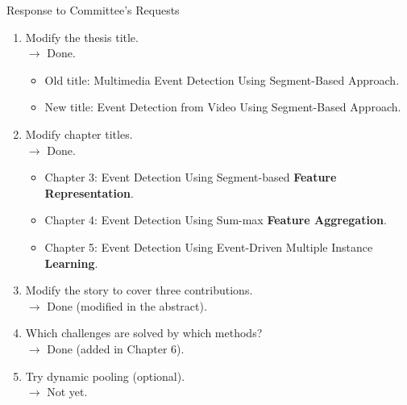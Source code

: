 \documentclass{beamer}
\begin{document}
	
\begin{frame}{Response to Committee's Requests} 	
	\begin{enumerate}
		\item Modify the thesis title.
		\\
		$\rightarrow$ Done. 
		\begin{itemize}
			\item \scriptsize{Old title: Multimedia Event Detection Using Segment-Based Approach.}
			\item New title: Event Detection from Video Using Segment-Based Approach.
		\end{itemize}
		\item Modify chapter titles.
		\\
		$\rightarrow$ Done.
		\begin{itemize}
			\item \scriptsize{Chapter 3: Event Detection Using Segment-based \textbf{Feature Representation}.}
			\item Chapter 4: Event Detection Using Sum-max \textbf{Feature Aggregation}.
			\item Chapter 5: Event Detection Using Event-Driven Multiple Instance \textbf{Learning}.
		\end{itemize}	
		\item Modify the story to cover three contributions.
		\\
		$\rightarrow$ Done (modified in the abstract).
		\item Which challenges are solved by which methods?
		\\
		$\rightarrow$ Done (added in Chapter 6).
		\item Try dynamic pooling (optional).
		\\
		$\rightarrow$ Not yet.
	\end{enumerate}
\end{frame}	
\end{document}
